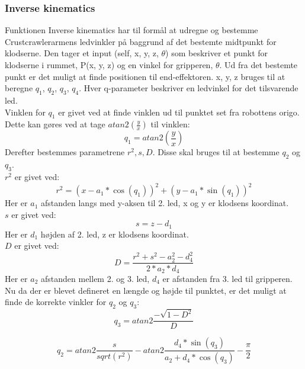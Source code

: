 \subsubsection{Inverse kinematics}
\label{subsub: Inverse kinematics}

Funktionen Inverse kinematics har til formål at udregne og bestemme Crustcrawlerarmens ledvinkler på baggrund af det bestemte midtpunkt for klodserne. Den tager et input (self, x, y, z, $\theta$) som beskriver et punkt for klodserne i rummet, P(x, y, z) og en vinkel for gripperen, $\theta$. Ud fra det bestemte punkt er det muligt at finde positionen til end-effektoren. x, y, z bruges til at beregne $q_1$, $q_2$, $q_3$, $q_4$. Hver q-parameter beskriver en ledvinkel for det tilsvarende led.\\

Vinklen for $q_1$ er givet ved at finde vinklen ud til punktet set fra robottens origo. Dette kan gøres ved at tage $atan2(\frac{y}{x})$ til vinklen:
\begin{equation}
q_1 = atan2(\frac{y}{x})
\end{equation}
Derefter bestemmes parametrene $r^2, s, D$. Disse skal bruges til at bestemme $q_2$ og $q_3$. \\

$r^2$ er givet ved:
\begin{equation}
r^2 = (x - a_1 * \cos(q_1))^2 + (y - a_1 * \sin(q_1))^2
\end{equation}
Her er $a_1$ afstanden langs med y-aksen til 2. led, x og y er klodsens koordinat.\\

$s$ er givet ved:
\begin{equation}
s = z - d_1
\end{equation}
Her er $d_1$ højden af 2. led, z er klodsens koordinat.\\

$D$ er givet ved:
\begin{equation}
D = \frac{r^2 + s^2 - a_2^2 - d_4^2}{2 * a_2 * d_4}
\end{equation}
Her er $a_2$ afstanden mellem 2. og 3. led, $d_4$ er afstanden fra 3. led til gripperen.\\

Nu da der er blevet defineret en længde og højde til punktet, er det muligt at finde de korrekte vinkler for $q_2$ og $q_3$:
\begin{equation}
q_3 = atan2\frac{-\sqrt{1 - D^2}}{D}
\end{equation}

\begin{equation}
q_2 = atan2\frac{s}{sqrt(r^2)} - atan2\frac{d_4 * \sin(q_3)}{a_2 + d_4 * \cos(q_3)} - \frac{\pi}{2}
\end{equation}